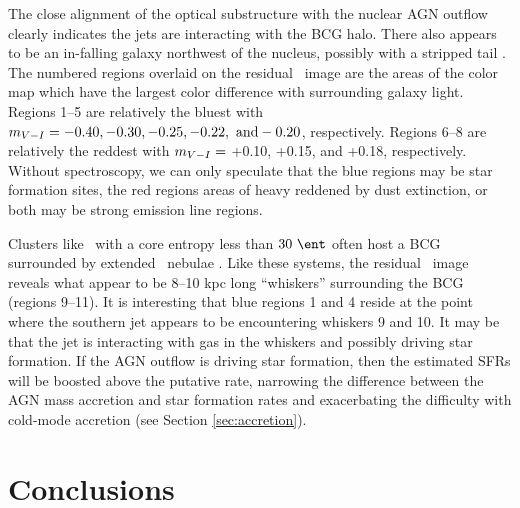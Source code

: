 \documentclass[iop]{emulateapj}
\begin{document}
The close alignment of the optical substructure with the nuclear AGN
outflow clearly indicates the jets are interacting with the BCG
halo. There also appears to be an in-falling galaxy northwest of the
nucleus, possibly with a stripped tail \citep[see][for
  example]{2007ApJ...671..190S}. The numbered regions overlaid on the
residual \myv\ image are the areas of the color map which have the
largest color difference with surrounding galaxy light. Regions 1--5
are relatively the bluest with $m_{V-I} = -0.40, -0.30, -0.25,
-0.22, ~\rm{and} -0.20$, respectively. Regions 6--8 are relatively the
reddest with $m_{V-I} =$ +0.10, +0.15, and +0.18,
respectively. Without spectroscopy, we can only speculate that the
blue regions may be star formation sites, the red regions areas of
heavy reddened by dust extinction, or both may be strong emission line
regions.

Clusters like \rbs\ with a core entropy less than $30 ~\ent$ often
host a BCG surrounded by extended \halpha\ nebulae
\citep[\eg][]{mcdonald10}. Like these systems, the residual
\myi\ image reveals what appear to be 8--10 kpc long ``whiskers''
surrounding the BCG (regions 9--11). It is interesting that blue
regions 1 and 4 reside at the point where the southern jet appears to
be encountering whiskers 9 and 10. It may be that the jet is
interacting with gas in the whiskers and possibly driving star
formation. If the AGN outflow is driving star formation, then the
estimated SFRs will be boosted above the putative rate, narrowing the
difference between the AGN mass accretion and star formation rates and
exacerbating the difficulty with cold-mode accretion (see Section
\ref{sec:accretion}).

\section{Conclusions}
\label{sec:con}
\end{document}
